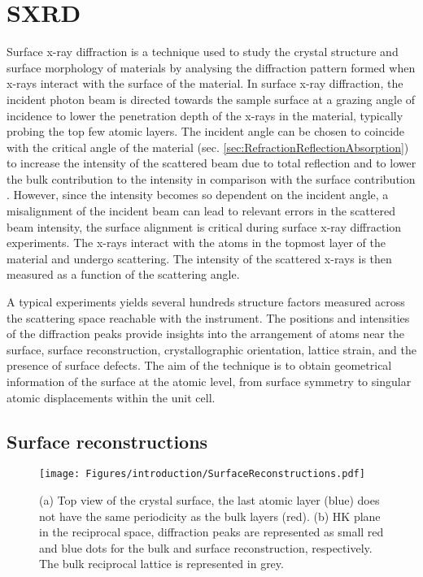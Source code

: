 \section{SXRD} \label{sec:SXRD}

Surface x-ray diffraction is a technique used to study the crystal structure and surface morphology of materials by analysing the diffraction pattern formed when x-rays interact with the surface of the material.
In surface x-ray diffraction, the incident photon beam is directed towards the sample surface at a grazing angle of incidence to lower the penetration depth of the x-rays in the material, typically probing the top few atomic layers.
The incident angle can be chosen to coincide with the critical angle of the material (sec. \ref{sec:RefractionReflectionAbsorption}) to increase the intensity of the scattered beam due to total reflection and to lower the bulk contribution to the intensity in comparison with the surface contribution \parencite{Feidenhansl1989, Moritz2022}.
However, since the intensity becomes so dependent on the incident angle, a misalignment of the incident beam can lead to relevant errors in the scattered beam intensity, the surface alignment is critical during surface x-ray diffraction experiments.
The x-rays interact with the atoms in the topmost layer of the material and undergo scattering.
The intensity of the scattered x-rays is then measured as a function of the scattering angle.

A typical experiments yields several hundreds structure factors measured across the scattering space reachable with the instrument.
The positions and intensities of the diffraction peaks provide insights into the arrangement of atoms near the surface, surface reconstruction, crystallographic orientation, lattice strain, and the presence of surface defects.
The aim of the technique is to obtain geometrical information of the surface at the atomic level, from surface symmetry to singular atomic displacements within the unit cell.

\subsection{Surface reconstructions} \label{sec:SurfaceReconstructions}

\begin{figure}[!htb]
    \centering
    \texttt{[image: Figures/introduction/SurfaceReconstructions.pdf]}
    \caption{
    (a) Top view of the crystal surface, the last atomic layer (blue) does not have the same periodicity as the bulk layers (red).
    (b) HK plane in the reciprocal space, diffraction peaks are represented as small red and blue dots for the bulk and surface reconstruction, respectively. The bulk reciprocal lattice is represented in grey.
    }
    \label{fig:SurfaceReconstructions}
\end{figure}

